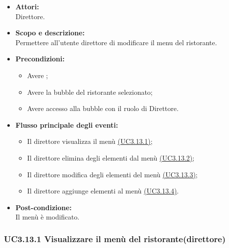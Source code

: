 \begin{itemize}
	\item \textbf{Attori:}
	\\Direttore.
	\item \textbf{Scopo e descrizione:} 
	\\Permettere all’utente direttore di modificare il menu del ristorante.
	\item \textbf{Precondizioni:}
	\begin{itemize}
		\item Avere ;
		\item Avere la bubble del ristorante selezionato;
		\item Avere accesso alla bubble con il ruolo di Direttore.
	\end{itemize}
	\item \textbf{Flusso principale degli eventi:}
	\begin{itemize}
		\item Il direttore visualizza il menù \hyperref[UC3.13.1]{(UC3.13.1)};
		\item Il direttore elimina degli elementi dal menù \hyperref[UC3.13.2]{(UC3.13.2)};
		\item Il direttore modifica degli elementi del menù \hyperref[UC3.13.3]{(UC3.13.3)};
		\item Il direttore aggiunge elementi al menù \hyperref[UC3.13.4]{(UC3.13.4)}.
	\end{itemize}
	\item \textbf{Post-condizione:}
	\\Il menù è modificato.
\end{itemize}

\subsubsection{UC3.13.1 Visualizzare il menù del ristorante(direttore)} \label{UC3.13.1}

